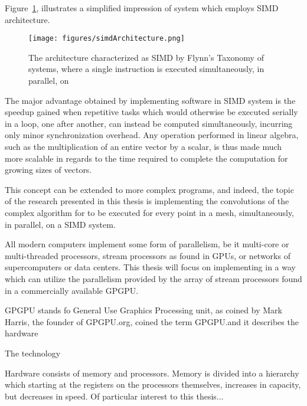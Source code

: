 Figure~\ref{fig:simdArchitecture}, illustrates a simplified impression of system which employs SIMD architecture.

\begin{figure}[ht]
\ffigbox
	{\texttt{[image: figures/simdArchitecture.png]}}
	{\caption[SIMD Architecture]{The architecture characterized as SIMD by Flynn's Taxonomy of systems, where a single instruction is executed simultaneously, in parallel, on }\label{fig:simdArchitecture}}
\end{figure}

The major advantage obtained by implementing software in SIMD system is the speedup gained when repetitive tasks which would otherwise be executed serially in a loop, one after another, can instead be computed simultaneously, incurring only minor synchronization overhead. Any operation performed in linear algebra, such as the multiplication of an entire vector by a scalar, is thus made much more scalable in regards to the time required to complete the computation for growing sizes of vectors.

This concept can be extended to more complex programs, and indeed, the topic of the research presented in this thesis is implementing the convolutions of the complex algorithm for  to be executed for every point in a mesh, simultaneously, in parallel, on a SIMD system.

All modern computers implement some form of parallelism, be it multi-core or multi-threaded processors, stream processors as found in GPUs, or networks of supercomputers or data centers. This thesis will focus on implementing  in a way which can utilize the parallelism provided by the array of stream processors found in a commercially available GPGPU.

GPGPU stands fo General Use Graphics Processing unit, as coined by Mark Harris, the founder of GPGPU.org, coined the term GPGPU.and it describes the hardware

The technology

Hardware consists of memory and processors. Memory is divided into a hierarchy which starting at the registers on the processors themselves, increases in capacity, but decreases in speed. Of particular interest to this thesis...



